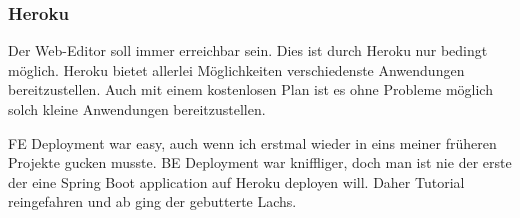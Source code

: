 \subsubsection{Heroku}\label{subsubsec:heroku}
Der Web-Editor soll immer erreichbar sein.
Dies ist durch Heroku nur bedingt möglich.
Heroku bietet allerlei Möglichkeiten verschiedenste Anwendungen bereitzustellen.
Auch mit einem kostenlosen Plan ist es ohne Probleme möglich solch kleine Anwendungen bereitzustellen.

FE Deployment war easy, auch wenn ich erstmal wieder in eins meiner früheren Projekte gucken musste.
BE Deployment war kniffliger, doch man ist nie der erste der eine Spring Boot application
auf Heroku deployen will.
Daher Tutorial reingefahren und ab ging der gebutterte Lachs.